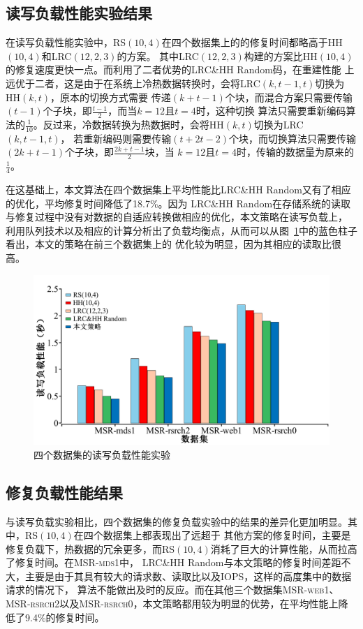 \subsection{读写负载性能实验结果}


在读写负载性能实验中，RS$(10,4)$在四个数据集上的的修复时间都略高于HH$(10,4)$和LRC$(12,2,3)$的方案。
其中LRC$(12,2,3)$构建的方案比HH$(10,4)$的修复速度更快一点。而利用了二者优势的LRC\&HH Random码，在重建性能
上远优于二者，这是由于在系统上冷热数据转换时，会将LRC$(k,t-1,t)$切换为HH$(k,t)$，原本的切换方式需要
传递$(k+t-1)$个块，而混合方案只需要传输$(t-1)$个子块，即$\frac{t-1}{2}$，而当$k=12$且$t=4$时，这种切换
算法只需要重新编码算法的$\frac{1}{10}$。反过来，冷数据转换为热数据时，会将HH$(k,t)$切换为LRC$(k,t-1,t)$，
若重新编码则需要传输$(t+2t-2)$个块，而切换算法只需要传输$(2k+t-1)$个子块，即$\frac{2k+t-1}{2}$块，当
$k=12$且$t=4$时，传输的数据量为原来的$\frac{1}{4}$。

在这基础上，本文算法在四个数据集上平均性能比LRC\&HH Random又有了相应的优化，平均修复时间降低了18.7\%。因为
LRC\&HH Random在存储系统的读取与修复过程中没有对数据的自适应转换做相应的优化，本文策略在读写负载上，
利用队列技术以及相应的计算分析出了负载均衡点，从而可以从图~\ref{fig:4-6}中的蓝色柱子看出，本文的策略在前三个数据集上的
优化较为明显，因为其相应的读取比很高。

\begin{figure}[htbp]
	\centering
	\includegraphics [scale=0.25]{figures/4-6.pdf}
	\caption{四个数据集的读写负载性能实验}
	\label{fig:4-6}
\end{figure}


\subsection{修复负载性能结果}

与读写负载实验相比，四个数据集的修复负载实验中的结果的差异化更加明显。其中，RS$(10,4)$在四个数据集上都表现出了远超于
其他方案的修复时间，主要是修复负载下，热数据的冗余更多，而RS$(10,4)$消耗了巨大的计算性能，从而拉高了修复时间。在\textsc{MSR-mds1}中，
LRC\&HH Random与本文策略的修复时间差距不大，主要是由于其具有较大的请求数、读取比以及IOPS，这样的高度集中的数据请求的情况下，
算法不能做出及时的反应。而在其他三个数据集\textsc{MSR-web1}、\textsc{MSR-rsrch2}以及\textsc{MSR-rsrch0}，本文策略都用较为明显的优势，在平均性能上降低了9.4\%的修复时间。

